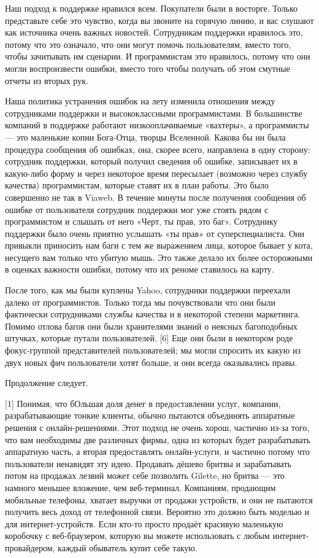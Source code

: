 \documentclass[ebook,12pt,oneside,openany]{memoir}
\begin{document}
Наш подход к поддержке нравился всем. Покупатели были в восторге.
Только представьте себе это чувство, когда вы звоните на горячую
линию, и вас слушают как источника очень важных новостей. Сотрудникам
поддержки нравилось это, потому что это означало, что они могут помочь
пользователям, вместо того, чтобы зачитывать им сценарии. И
программистам это нравилось, потому что они могли воспроизвести
ошибки, вместо того чтобы получать об этом смутные отчеты из вторых
рук.

Наша политика устранения ошибок на лету изменила отношения между
сотрудниками поддержки и высококлассными программистами. В большинстве
компаний в поддержке работают низкооплачиваемые «вахтеры», а
программисты — это маленькие копии Бога-Отца, творцы Вселенной. Какова
бы ни была процедура сообщения об ошибках, она, скорее всего,
направлена в одну сторону: сотрудник поддержки, который получил
сведения об ошибке, записывает их в какую-либо форму и через некоторое
время пересылает (возможно через службу качества) программистам,
которые ставят их в план работы. Это было совершенно не так в Viaweb.
В течение минуты после получения сообщения об ошибке от пользователя
сотрудник поддержки мог уже стоять рядом с программистом и слышать от
него «Черт, ты прав, это баг». Сотруднику поддержки было очень приятно
услышать «ты прав» от суперспециалиста. Они привыкли приносить нам
баги с тем же выражением лица, которое бывает у кота, несущего вам
только что убитую мышь. Это также делало их более осторожными в
оценках важности ошибки, потому что их реноме ставилось на карту.

После того, как мы были куплены Yahoo, сотрудники поддержки переехали
далеко от программистов. Только тогда мы почувствовали что они были
фактически сотрудниками службы качества и в некоторой степени
маркетинга. Помимо отлова багов они были хранителями знаний о неясных
багоподобных штучках, которые путали пользователей. [6] Еще они были в
некотором роде фокус-группой представителей пользователей; мы могли
спросить их какую из двух новых фич пользователи хотят больше, и они
всегда оказывались правы.

Продолжение следует.

[1] Понимая, что бОльшая доля денег в предоставлении услуг, компании,
разрабатывающие тонкие клиенты, обычно пытаются объединять аппаратные
решения с онлайн-решениями. Этот подход не очень хорош, частично из-за
того, что вам необходимы две различных фирмы, одна из которых будет
разрабатывать аппаратную часть, а вторая предоставлять онлайн-услуги,
и частично потому что пользователи ненавидят эту идею. Продавать
дёшево бритвы и зарабатывать потом на продажах лезвий может себе
позволить Gilette, но бритва — это намного меньшее вложение, чем
веб-терминал. Компаниям, продающим мобильные телефоны, хватает выручки
от продажи устройств, и они не пытаются получить весь доход от
телефонной связи. Вероятно это должно быть моделью и для
интернет-устройств. Если кто-то просто продаёт красивую маленькую
коробочку с веб-браузером, которую вы можете использовать с любым
интернет-провайдером, каждый обыватель купит себе такую.
\end{document}
